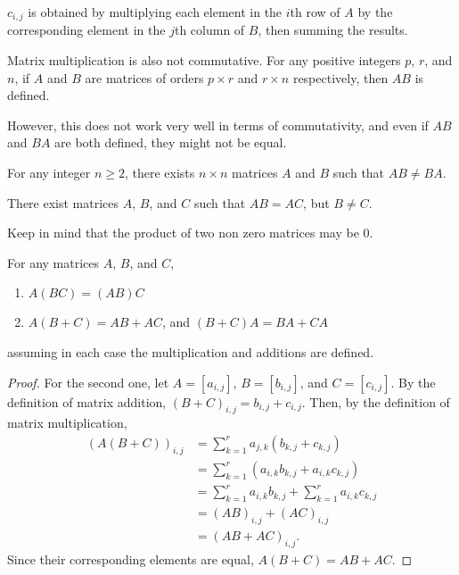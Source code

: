  $c_{i, j}$ is obtained by multiplying each element in the $i$th row of $A$ by the corresponding element in the 
 $j$th column of $B$, then summing the results. 

 Matrix multiplication is also not commutative. 
 For any positive integers $p$, $r$, and $n$, if $A$ and $B$ are matrices of orders $p \times r$ and $r \times n$
 respectively, then $AB$ is defined.

 However, this does not work very well in terms of commutativity, and even if $AB$ and $BA$ are both defined, they
 might not be equal.

 \begin{corollary}
   For any integer $n \geq 2$, there exists $n \times n$ matrices $A$ and $B$ such that $AB \neq BA$.
 \end{corollary}

 \begin{corollary}
   There exist matrices $A$, $B$, and $C$ such that $AB = AC$, but $B \neq C$.
 \end{corollary}

Keep in mind that the product of two non zero matrices may be 0.

           \begin{theorem}
             For any matrices $A$, $B$, and $C$, 
             \begin{enumerate}
               \item $A(BC) = (AB)C$ 
               \item $A(B + C) = AB + AC$, and $(B + C)A = BA + CA$
             \end{enumerate}
             assuming in each case the multiplication and additions are defined.
           \end{theorem}

\begin{proof}
  For the second one, let $A = \left[a_{i, j}\right]$, $B = \left[b_{i, j}\right]$, and $C = \left[c_{i, j}\right]$. 
  By the definition of matrix addition, $(B + C)_{i, j} = b_{i, j} + c_{i, j}$.  
  Then, by the definition of matrix multiplication,
  \begin{align*}
    (A (B + C))_{i, j} &= \sum^{r}_{k = 1} a_{j, k} (b_{k, j} + c_{k, j}) \\ 
                       &= \sum^{r}_{k = 1} (a_{i, k}b_{k, j} + a_{i, k}c_{k, j}) \\
                       &= \sum^{r}_{k = 1}a_{i, k}b_{k, j} + \sum^{r}_{k = 1}a_{i, k}c_{k, j} \\ 
                       &= (AB)_{i, j} + (AC)_{i, j} \\
                       &= (AB + AC)_{i, j}.
  \end{align*}
  Since their corresponding elements are equal, $A(B + C) = AB + AC$.
\end{proof}

